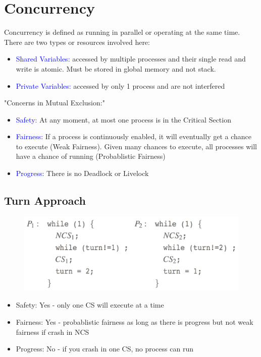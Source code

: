 \documentclass{hw}
\begin{document}
\section{Concurrency}
Concurrency is defined as running in parallel or operating at the same time. 
There are two types or resources involved here:

\begin{itemize}
  \item \textcolor{blue}{Shared Variables:} accessed by multiple processes and 
    their single read and write is atomic. Must be stored in global memory and not
    stack.
  \item \textcolor{blue}{Private Variables:} accessed by only 1 process and are
    not interfered
\end{itemize}

"Concerns in Mutual Exclusion:"
\begin{itemize}
  \item \textcolor{blue}{Safety:} At any moment, at most one process is in the 
  Critical Section
  \item \textcolor{blue}{Fairness:} If a process is continuously enabled, it will
    eventually get a chance to execute (Weak Fairness). Given many chances to
    execute, all processes will have a chance of running (Probablistic Fairness)
  \item \textcolor{blue}{Progress:} There is no Deadlock or Livelock
\end{itemize}

\subsection{Turn Approach}
\begin{figure}[H]
  \centering
  \includegraphics[scale=.4]{turn}
\end{figure}

\begin{itemize}
  \item Safety:    Yes - only one CS will execute at a time                 
  \item Fairness:  Yes  - probablistic fairness as long as there is progress but
    not weak fairness if crash in NCS
  \item Progress:  No - if you crash in one CS, no process can run          
\end{itemize}
\end{document}
